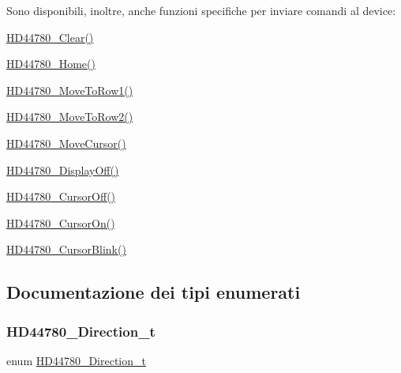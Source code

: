 Sono disponibili, inoltre, anche funzioni specifiche per inviare comandi al device\+:
\begin{DoxyItemize}
\item \hyperlink{group___h_d44780_ga38cac13d7a66f068be54f79a716ff7d4}{H\+D44780\+\_\+\+Clear()}
\item \hyperlink{group___h_d44780_ga68e3712332aa9482d4bdaa4991a92127}{H\+D44780\+\_\+\+Home()}
\item \hyperlink{group___h_d44780_gad90e2924a4e632ce42940323f8f49e37}{H\+D44780\+\_\+\+Move\+To\+Row1()}
\item \hyperlink{group___h_d44780_ga713670d498b6f5d50a174df19081c515}{H\+D44780\+\_\+\+Move\+To\+Row2()}
\item \hyperlink{group___h_d44780_gabcea9a03050c46530e39b7556c673baf}{H\+D44780\+\_\+\+Move\+Cursor()}
\item \hyperlink{group___h_d44780_ga5cf07b2179272029410f9a81f56621ed}{H\+D44780\+\_\+\+Display\+Off()}
\item \hyperlink{group___h_d44780_ga56421dc398825188aa10257063a3ee4b}{H\+D44780\+\_\+\+Cursor\+Off()}
\item \hyperlink{group___h_d44780_ga3a381cb44df5d76d79be5ed71a52bae6}{H\+D44780\+\_\+\+Cursor\+On()}
\item \hyperlink{group___h_d44780_ga92eb58cb7d73c9a87b7087a9c56f73d5}{H\+D44780\+\_\+\+Cursor\+Blink()}~\newline
 
\end{DoxyItemize}

\subsection{Documentazione dei tipi enumerati}
\mbox{\label{group___h_d44780_gaf46f4db4f981d3a1088804a6d6980d30}} 
\subsubsection{\texorpdfstring{H\+D44780\+\_\+\+Direction\+\_\+t}{HD44780\_Direction\_t}}
{\footnotesize\ttfamily enum \hyperlink{group___h_d44780_gaf46f4db4f981d3a1088804a6d6980d30}{H\+D44780\+\_\+\+Direction\+\_\+t}}



